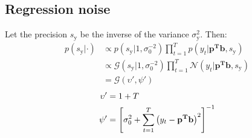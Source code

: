 \documentclass[smallextended]{svjour3}          %
\newcommand\alberto[1]{\textcolor{black}{#1}}
\begin{document}
\subsection{Regression noise}
Let the precision $s_{\text{y}}$ be the inverse of the variance $\sigma_{\text{y}}^{2}$. Then:
\begin{align*}
p(s_{\text{y}} | \cdot) &\propto
p(s_{\text{y}} | 1,\sigma_{0}^{-2}) \prod_{t=1}^T p(y_t | \mathbf{p^T b}, s_{\text{y}})\\
&\propto \mathcal{G}(s_{\text{y}} | 1,\sigma_{\text{0}}^{-2}) \prod_{t=1}^T \mathcal{N}( y_t | \mathbf{p^T b}, s_{\text{y}})\\
&= \mathcal{G}(\upsilon', \psi')  
\end{align*}
\begin{align*}
\upsilon' &= 1+T\\ 
\psi' &= \alberto{\left[\sigma_{\text{0}}^{2} + \sum_{t=1}^{T}\left(y_t-\mathbf{p^Tb}\right)^2\right]^{-1}}
\end{align*}


\end{document}
